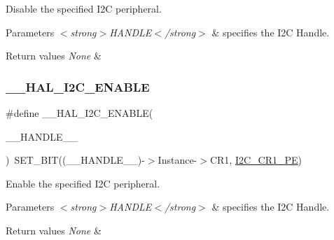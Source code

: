 Disable the specified I2C peripheral. 


\begin{DoxyParams}{Parameters}
{\em $<$strong$>$\+H\+A\+N\+D\+L\+E$<$/strong$>$} & specifies the I2C Handle. \\
\hline
\end{DoxyParams}

\begin{DoxyRetVals}{Return values}
{\em None} & \\
\hline
\end{DoxyRetVals}
\mbox{\label{group___i2_c___exported___macros_gacff412c47b0c1d63ef3b2a07f65988b7}} 
\subsubsection{\texorpdfstring{\+\_\+\+\_\+\+H\+A\+L\+\_\+\+I2\+C\+\_\+\+E\+N\+A\+B\+LE}{\_\_HAL\_I2C\_ENABLE}}
{\footnotesize\ttfamily \#define \+\_\+\+\_\+\+H\+A\+L\+\_\+\+I2\+C\+\_\+\+E\+N\+A\+B\+LE(\begin{DoxyParamCaption}\item[{}]{\+\_\+\+\_\+\+H\+A\+N\+D\+L\+E\+\_\+\+\_\+ }\end{DoxyParamCaption})~S\+E\+T\+\_\+\+B\+IT((\+\_\+\+\_\+\+H\+A\+N\+D\+L\+E\+\_\+\+\_\+)-\/$>$Instance-\/$>$C\+R1, \hyperlink{group___peripheral___registers___bits___definition_ga953b0d38414808db79da116842ed3262}{I2\+C\+\_\+\+C\+R1\+\_\+\+PE})}



Enable the specified I2C peripheral. 


\begin{DoxyParams}{Parameters}
{\em $<$strong$>$\+H\+A\+N\+D\+L\+E$<$/strong$>$} & specifies the I2C Handle. \\
\hline
\end{DoxyParams}

\begin{DoxyRetVals}{Return values}
{\em None} & \\
\hline
\end{DoxyRetVals}
\mbox{\label{group___i2_c___exported___macros_gac9d8b249b06b2d30f987acc9ceebd1d9}} 
